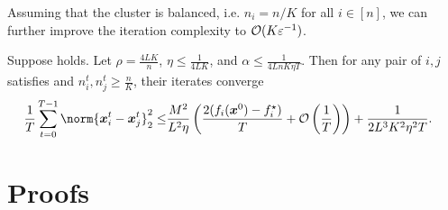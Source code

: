 \documentclass{article}
\begin{document}
Assuming that the cluster is balanced, i.e. $n_i=n/K$ for all $i\in[n]$, we can further improve the iteration complexity to $\mathcal{O}(K\varepsilon^{-1})$.
\begin{theorem}\label{th:consensus-distance:balanced}
  Suppose  holds. Let $\rho=\frac{4LK}{n}$, $\eta\le\frac{1}{4LK}$, and $\alpha\le\frac{1}{4LnK\eta T}$. Then for any pair of $i,j$ satisfies  and $n_i^t,n_j^t\ge \frac{n}{K}$, their iterates converge
  \begin{align*}
    \frac{1}{T} \sum_{t=0}^{T-1} \norm{\xx_i^{t} - \xx_j^{t}}_2^2
    \le& \frac{M^2}{L^2\eta}\left( \frac{2(f_i(\xx^{0}) - f_i^\star)}{T} + \cO\left(\frac{1}{T}\right) \right)
    + \frac{1}{2L^3K^2\eta^2T}.
  \end{align*}
  \end{theorem}




\newpage
\appendix

\section{Proofs}
\end{document}
